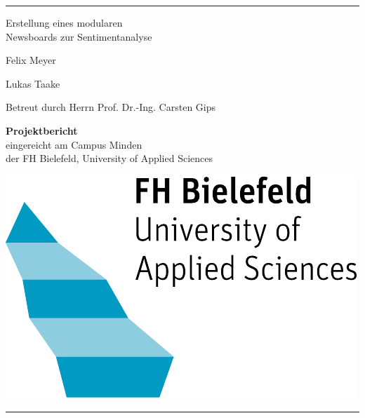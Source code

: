 \begin{titlepage}
    \hrule
	\vspace*{3cm}
	\begin{center}
		{\LARGE \sc Erstellung eines modularen\\[2pt] Newsboards zur Sentimentanalyse }

			\vspace*{20pt}
			
			\begin{multicols}{2}
				Felix Meyer
				\columnbreak
				
				Lukas Taake
			\end{multicols}
			
			\vspace*{20pt}
			
			{\Large Betreut durch Herrn Prof. Dr.-Ing. Carsten Gips}

			\vspace*{48pt}
			{\bf Projektbericht}\\
			eingereicht am Campus Minden\\
			der FH Bielefeld, University of Applied Sciences\\
			
			\vspace*{72pt}
			\noindent{\today}
		
		\vspace*{100pt}
		\includegraphics[scale=0.5]{assets/fh-logo.pdf}
	\end{center}
	\vfill
    \hrule
\end{titlepage}